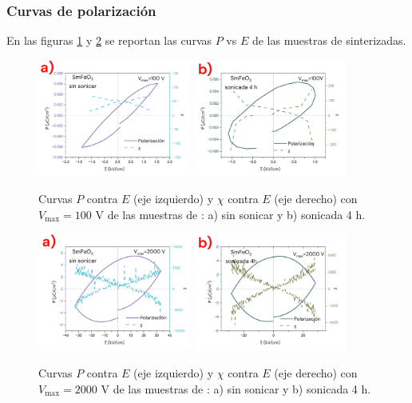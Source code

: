 \documentclass[../main.tex]{subfiles}
\begin{document}
\subsubsection{Curvas de polarización}
En las figuras \ref{fig:sm100v} y \ref{fig:sm2000v} se reportan las curvas $P$ vs $E$ de las muestras de \sama{} sinterizadas.
\begin{figure}[H]
    \centering
    \includegraphics[width=0.45\textwidth]{fig/PESmFeO3100V.png}
    \quad
    \includegraphics[width=0.45\textwidth]{fig/PESmFeO3-S100V.png}
    \caption{Curvas $P$ contra $E$ (eje izquierdo) y $\chi$ contra $E$ (eje derecho) con $V_\text{max}=100$ V de las muestras de \sama{}: a) sin sonicar y b) sonicada 4 h.}
    \label{fig:sm100v}
\end{figure}
\begin{figure}[H]
    \centering
    \includegraphics[width=0.45\textwidth]{fig/PESmFeO32000V.png}
    \quad
    \includegraphics[width=0.45\textwidth]{fig/PESmFeO3-S2000V.png}
    \caption{Curvas $P$ contra $E$ (eje izquierdo) y $\chi$ contra $E$ (eje derecho) con $V_\text{max}=2000$ V de las muestras de \sama{}: a) sin sonicar y b) sonicada 4 h.}
    \label{fig:sm2000v}
\end{figure}
\end{document}
